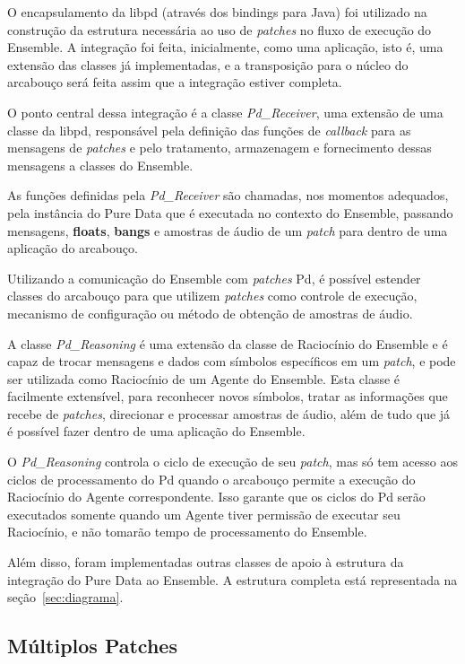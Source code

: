 \documentclass[a4paper, 11pt, twoside]{article}
\begin{document}
\begin{multicols}{2}
O encapsulamento da libpd (através dos bindings para Java) foi utilizado na 
construção da estrutura necessária ao uso de \textit{patches} no fluxo de 
execução do Ensemble. A integração foi feita, inicialmente, como uma aplicação,
isto é, uma extensão das classes já implementadas, e a transposição para o 
núcleo do arcabouço será feita assim que a integração estiver completa.

O ponto central dessa integração é a classe \textit{Pd\_Receiver}, uma extensão
de uma classe da libpd, responsável pela definição das funções de 
\textit{callback} para as mensagens de \textit{patches} e pelo tratamento,
armazenagem e fornecimento dessas mensagens a classes do Ensemble.

As funções definidas pela \textit{Pd\_Receiver} são chamadas, nos momentos 
adequados, pela instância do Pure Data que é executada no contexto do Ensemble,
passando mensagens, \textbf{floats}, \textbf{bangs} e amostras de áudio
de um \textit{patch} para dentro de uma aplicação do arcabouço.

Utilizando a comunicação do Ensemble com \textit{patches} Pd, é possível
estender classes do arcabouço para que utilizem \textit{patches} como controle
de execução, mecanismo de configuração ou método de obtenção de amostras
de áudio.

A classe \textit{Pd\_Reasoning} é uma extensão da classe de Raciocínio
do Ensemble e é capaz de trocar mensagens e dados com símbolos específicos 
em um \textit{patch}, e pode ser utilizada como Raciocínio de um Agente do
Ensemble. Esta classe é facilmente extensível, para reconhecer novos símbolos,
tratar as informações que recebe de \textit{patches}, direcionar e processar
amostras de áudio, além de tudo que já é possível fazer dentro de uma aplicação do 
Ensemble.

O \textit{Pd\_Reasoning} controla o ciclo de execução de seu \textit{patch},
mas só tem acesso aos ciclos de processamento do Pd quando o arcabouço
permite a execução do Raciocínio do Agente correspondente. Isso garante
que os ciclos do Pd serão executados somente quando um Agente tiver
permissão de executar seu Raciocínio, e não tomarão tempo de processamento
do Ensemble.

Além disso, foram implementadas outras classes de apoio à estrutura da
integração do Pure Data ao Ensemble. A estrutura completa está representada
na seção~\ref{sec:diagrama}.

\subsection{Múltiplos Patches}


\end{multicols}
\end{document}
